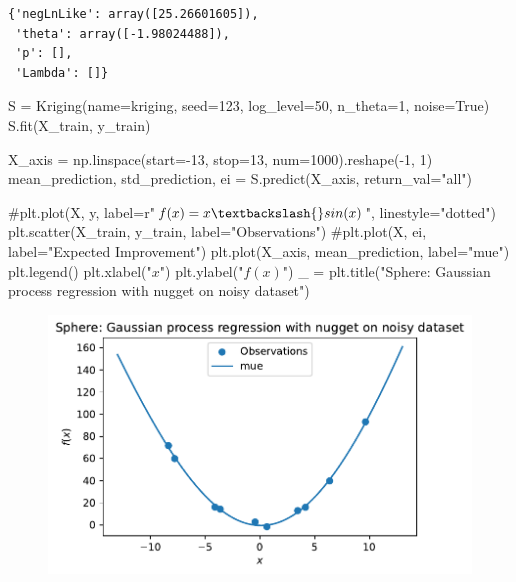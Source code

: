 \documentclass[
  letterpaper,
  DIV=11,
  numbers=noendperiod]{scrreprt}
\newenvironment{Shaded}{\begin{snugshade}}{\end{snugshade}}
\newcommand{\CommentTok}[1]{\textcolor[rgb]{0.37,0.37,0.37}{#1}}
\newcommand{\DecValTok}[1]{\textcolor[rgb]{0.68,0.00,0.00}{#1}}
\newcommand{\NormalTok}[1]{\textcolor[rgb]{0.00,0.23,0.31}{#1}}
\newcommand{\OperatorTok}[1]{\textcolor[rgb]{0.37,0.37,0.37}{#1}}
\newcommand{\StringTok}[1]{\textcolor[rgb]{0.13,0.47,0.30}{#1}}
\newcommand{\VariableTok}[1]{\textcolor[rgb]{0.07,0.07,0.07}{#1}}
\begin{document}
\begin{verbatim}
{'negLnLike': array([25.26601605]),
 'theta': array([-1.98024488]),
 'p': [],
 'Lambda': []}
\end{verbatim}

\begin{Shaded}
\begin{Highlighting}[]
\NormalTok{S }\OperatorTok{=}\NormalTok{ Kriging(name}\OperatorTok{=}\StringTok{\textquotesingle{}kriging\textquotesingle{}}\NormalTok{,}
\NormalTok{            seed}\OperatorTok{=}\DecValTok{123}\NormalTok{,}
\NormalTok{            log\_level}\OperatorTok{=}\DecValTok{50}\NormalTok{,}
\NormalTok{            n\_theta}\OperatorTok{=}\DecValTok{1}\NormalTok{,}
\NormalTok{            noise}\OperatorTok{=}\VariableTok{True}\NormalTok{)}
\NormalTok{S.fit(X\_train, y\_train)}

\NormalTok{X\_axis }\OperatorTok{=}\NormalTok{ np.linspace(start}\OperatorTok{={-}}\DecValTok{13}\NormalTok{, stop}\OperatorTok{=}\DecValTok{13}\NormalTok{, num}\OperatorTok{=}\DecValTok{1000}\NormalTok{).reshape(}\OperatorTok{{-}}\DecValTok{1}\NormalTok{, }\DecValTok{1}\NormalTok{)}
\NormalTok{mean\_prediction, std\_prediction, ei }\OperatorTok{=}\NormalTok{ S.predict(X\_axis, return\_val}\OperatorTok{=}\StringTok{"all"}\NormalTok{)}

\CommentTok{\#plt.plot(X, y, label=r"$f(x) = x \textbackslash{}sin(x)$", linestyle="dotted")}
\NormalTok{plt.scatter(X\_train, y\_train, label}\OperatorTok{=}\StringTok{"Observations"}\NormalTok{)}
\CommentTok{\#plt.plot(X, ei, label="Expected Improvement")}
\NormalTok{plt.plot(X\_axis, mean\_prediction, label}\OperatorTok{=}\StringTok{"mue"}\NormalTok{)}
\NormalTok{plt.legend()}
\NormalTok{plt.xlabel(}\StringTok{"$x$"}\NormalTok{)}
\NormalTok{plt.ylabel(}\StringTok{"$f(x)$"}\NormalTok{)}
\NormalTok{\_ }\OperatorTok{=}\NormalTok{ plt.title(}\StringTok{"Sphere: Gaussian process regression with nugget on noisy dataset"}\NormalTok{)}
\end{Highlighting}
\end{Shaded}

\begin{figure}[H]

{\centering \includegraphics{07_spot_ei_files/figure-pdf/cell-52-output-1.pdf}

}

\end{figure}
\end{document}
